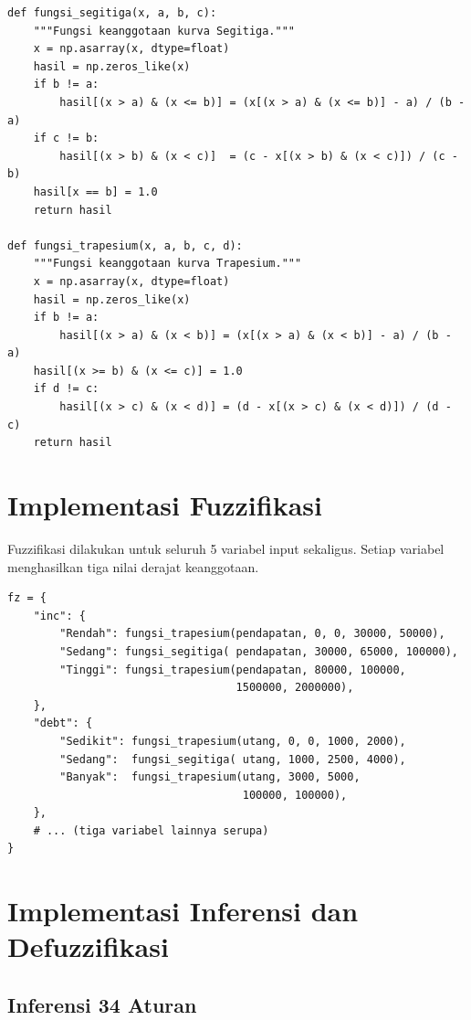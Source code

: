 \documentclass[12pt,a4paper]{report}
\begin{document}
\begin{lstlisting}[caption={Implementasi fungsi keanggotaan Segitiga dan Trapesium}]
def fungsi_segitiga(x, a, b, c):
    """Fungsi keanggotaan kurva Segitiga."""
    x = np.asarray(x, dtype=float)
    hasil = np.zeros_like(x)
    if b != a:
        hasil[(x > a) & (x <= b)] = (x[(x > a) & (x <= b)] - a) / (b - a)
    if c != b:
        hasil[(x > b) & (x < c)]  = (c - x[(x > b) & (x < c)]) / (c - b)
    hasil[x == b] = 1.0
    return hasil

def fungsi_trapesium(x, a, b, c, d):
    """Fungsi keanggotaan kurva Trapesium."""
    x = np.asarray(x, dtype=float)
    hasil = np.zeros_like(x)
    if b != a:
        hasil[(x > a) & (x < b)] = (x[(x > a) & (x < b)] - a) / (b - a)
    hasil[(x >= b) & (x <= c)] = 1.0
    if d != c:
        hasil[(x > c) & (x < d)] = (d - x[(x > c) & (x < d)]) / (d - c)
    return hasil
\end{lstlisting}

\section{Implementasi Fuzzifikasi}

Fuzzifikasi dilakukan untuk seluruh 5 variabel input sekaligus.
Setiap variabel menghasilkan tiga nilai derajat keanggotaan.

\begin{lstlisting}[caption={Proses fuzzifikasi untuk semua variabel input}]
fz = {
    "inc": {
        "Rendah": fungsi_trapesium(pendapatan, 0, 0, 30000, 50000),
        "Sedang": fungsi_segitiga( pendapatan, 30000, 65000, 100000),
        "Tinggi": fungsi_trapesium(pendapatan, 80000, 100000,
                                   1500000, 2000000),
    },
    "debt": {
        "Sedikit": fungsi_trapesium(utang, 0, 0, 1000, 2000),
        "Sedang":  fungsi_segitiga( utang, 1000, 2500, 4000),
        "Banyak":  fungsi_trapesium(utang, 3000, 5000,
                                    100000, 100000),
    },
    # ... (tiga variabel lainnya serupa)
}
\end{lstlisting}

\section{Implementasi Inferensi dan Defuzzifikasi}

\subsection{Inferensi 34 Aturan}
\end{document}
